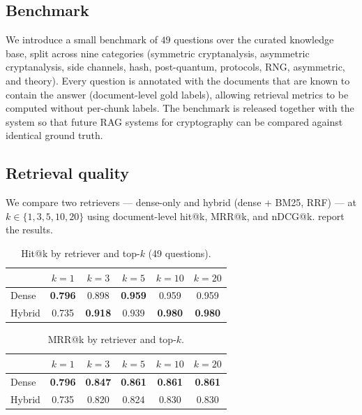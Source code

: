 \documentclass[version=submission]{iacrcc}
\begin{document}
\subsection{Benchmark}
We introduce a small benchmark of $49$ questions over the curated knowledge
base, split across nine categories (symmetric cryptanalysis, asymmetric
cryptanalysis, side channels, hash, post-quantum, protocols, RNG, asymmetric,
and theory). Every question is annotated with the documents that are known to
contain the answer (document-level gold labels), allowing retrieval metrics to
be computed without per-chunk labels. The benchmark is released together with
the system so that future RAG systems for cryptography can be compared against
identical ground truth.

\subsection{Retrieval quality}
We compare two retrievers --- dense-only and hybrid (dense + BM25, RRF) ---
at $k \in \{1,3,5,10,20\}$ using document-level hit@k, MRR@k, and nDCG@k.
 report the results.

\begin{table}[t]
\centering
\caption{Hit@k by retriever and top-$k$ (49 questions).}
\label{tab:eval1}
\begin{tabular}{lccccc}
\toprule
 & $k{=}1$ & $k{=}3$ & $k{=}5$ & $k{=}10$ & $k{=}20$\\
\midrule
Dense   & \textbf{0.796} & 0.898 & \textbf{0.959} & 0.959 & 0.959\\
Hybrid  & 0.735 & \textbf{0.918} & 0.939 & \textbf{0.980} & \textbf{0.980}\\
\bottomrule
\end{tabular}
\end{table}

\begin{table}[t]
\centering
\caption{MRR@k by retriever and top-$k$.}
\label{tab:eval2}
\begin{tabular}{lccccc}
\toprule
 & $k{=}1$ & $k{=}3$ & $k{=}5$ & $k{=}10$ & $k{=}20$\\
\midrule
Dense   & \textbf{0.796} & \textbf{0.847} & \textbf{0.861} & \textbf{0.861} & \textbf{0.861}\\
Hybrid  & 0.735 & 0.820 & 0.824 & 0.830 & 0.830\\
\bottomrule
\end{tabular}
\end{table}
\end{document}
